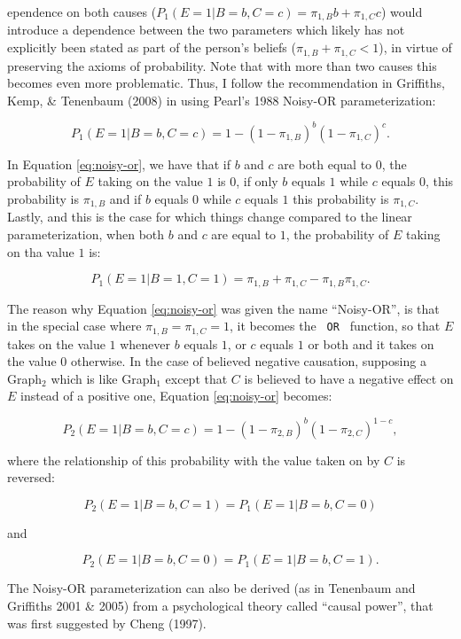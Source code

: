 \documentclass[11pt]{article}
\begin{document}
ependence on both causes ($P_1(E=1 | B=b, C=c) = \pi_{1, B}b + \pi_{1, C}c$) would introduce a dependence between the two parameters which likely has not explicitly been stated as part of the person's beliefs ($\pi_{1, B} + \pi_{1, C} < 1$), in virtue of preserving the axioms of probability. Note that with more than two causes this becomes even more problematic. Thus, I follow the recommendation in Griffiths, Kemp, \& Tenenbaum (2008) in using Pearl's 1988 Noisy-OR parameterization:

\begin{equation} \label{eq:noisy-or}
P_1(E=1 | B=b, C=c) = 1- (1-\pi_{1, B})^b(1- \pi_{1, C})^c.
\end{equation}

In Equation \ref{eq:noisy-or}, we have that if $b$ and $c$ are both equal to $0$, the probability of $E$ taking on the value $1$ is $0$, if only $b$ equals $1$ while $c$ equals $0$, this probability is $\pi_{1, B}$ and if $b$ equals $0$ while $c$ equals $1$ this probability is $\pi_{1, C}$. Lastly, and this is the case for which things change compared to the linear parameterization, when both $b$ and $c$ are equal to $1$, the probability of $E$ taking on tha value $1$ is:

$$P_1(E=1 | B=1, C=1)= \pi_{1, B} + \pi_{1, C} - \pi_{1, B}\pi_{1, C}.$$

The reason why Equation \ref{eq:noisy-or} was given the name ``Noisy-OR'', is that in the special case where $\pi_{1, B}=\pi_{1, C}=1$, it becomes the \verb| OR | function, so that $E$ takes on the value $1$ whenever $b$ equals $1$, or $c$ equals $1$ or both and it takes on the value $0$ otherwise. In the case of believed negative causation, supposing a Graph$_2$ which is like Graph$_1$ except that $C$ is believed to have a negative effect on $E$ instead of a positive one, Equation \ref{eq:noisy-or} becomes:

\begin{equation} \label{eq:neg-or}
P_2(E=1 | B=b, C=c) = 1- (1-\pi_{2, B})^b(1- \pi_{2, C})^{1-c},
\end{equation}

where the relationship of this probability with the value taken on by $C$ is reversed:

$$P_2(E=1 | B=b, C=1) = P_1(E=1 | B=b, C=0)$$

and

$$P_2(E=1 | B=b, C=0) = P_1(E=1 | B=b, C=1).$$

The Noisy-OR parameterization can also be derived (as in Tenenbaum and Griffiths 2001 \& 2005) from a psychological theory called ``causal power'', that was first suggested by Cheng (1997).
\end{document}
